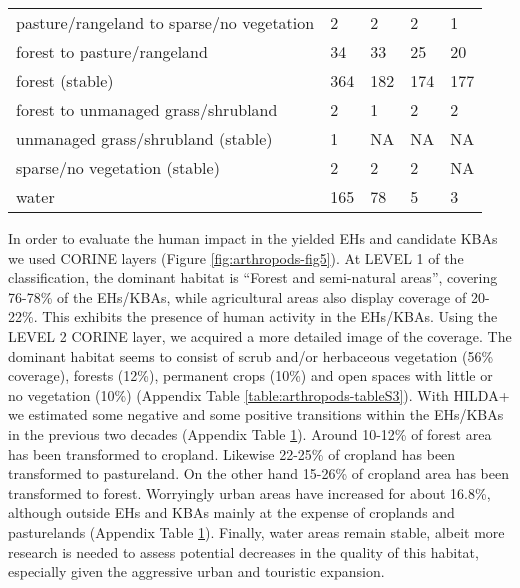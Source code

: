 \begin{table}[]
{\begin{tabular}{lllll}
pasture/rangeland to sparse/no vegetation      & 2           & 2                & 2         & 1               \\
forest to pasture/rangeland                    & 34          & 33               & 25        & 20              \\
forest (stable)                                & 364         & 182              & 174       & 177             \\
forest to unmanaged grass/shrubland            & 2           & 1                & 2         & 2               \\
unmanaged grass/shrubland (stable)             & 1           & NA               & NA        & NA              \\
sparse/no vegetation (stable)                  & 2           & 2                & 2         & NA              \\
water                                          & 165         & 78               & 5         & 3              
\end{tabular}%
}
\label{table:arthropods-tableS4}
\end{table}


In order to evaluate the human impact in the yielded EHs and candidate KBAs we
used CORINE layers (Figure \ref{fig:arthropods-fig5}). At LEVEL 1 of the classification, the dominant
habitat is “Forest and semi-natural areas”, covering ~ 76-78\% of the EHs/KBAs,
while agricultural areas also display coverage of 20-22\%. This exhibits the
presence of human activity in the EHs/KBAs. Using the LEVEL 2 CORINE
layer, we acquired a more detailed image of the coverage. The dominant habitat
seems to consist of scrub and/or herbaceous vegetation  (56\% coverage),
forests (12\%), permanent crops (10\%) and open spaces with little or
no vegetation (10\%) (Appendix Table \ref{table:arthropods-tableS3}). With HILDA+ we
estimated some negative and some positive transitions within the EHs/KBAs in
the previous two decades (Appendix Table \ref{table:arthropods-tableS4}). Around 10-12\% of
forest area has been transformed to cropland. Likewise 22-25\% of cropland has
been transformed to pastureland. On the other hand 15-26\% of cropland area has
been transformed to forest. Worryingly urban areas have increased for about 16.8\%,
although outside EHs and KBAs mainly at the expense of croplands and
pasturelands (Appendix Table \ref{table:arthropods-tableS4}). Finally, water areas remain
stable, albeit more research is needed to assess potential decreases in the
quality of this habitat, especially given the aggressive urban and touristic expansion.


